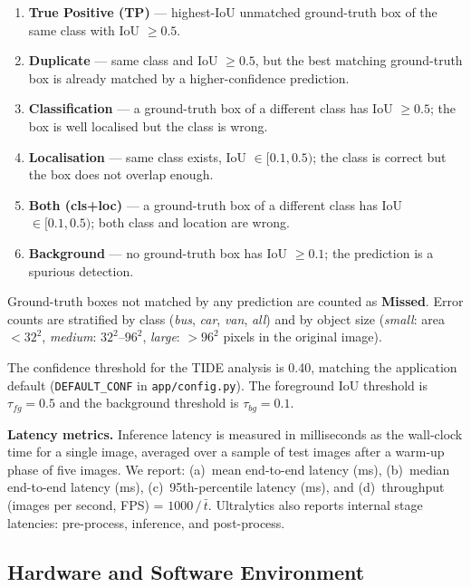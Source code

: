 \begin{enumerate}
  \item \textbf{True Positive (TP)} — highest-IoU unmatched ground-truth
        box of the same class with IoU $\ge 0.5$.
  \item \textbf{Duplicate} — same class and IoU $\ge 0.5$, but the
        best matching ground-truth box is already matched by a
        higher-confidence prediction.
  \item \textbf{Classification} — a ground-truth box of a different class
        has IoU $\ge 0.5$; the box is well localised but the class is wrong.
  \item \textbf{Localisation} — same class exists, IoU $\in [0.1, 0.5)$;
        the class is correct but the box does not overlap enough.
  \item \textbf{Both (cls+loc)} — a ground-truth box of a different class
        has IoU $\in [0.1, 0.5)$; both class and location are wrong.
  \item \textbf{Background} — no ground-truth box has IoU $\ge 0.1$;
        the prediction is a spurious detection.
\end{enumerate}

Ground-truth boxes not matched by any prediction are counted as
\textbf{Missed}.
Error counts are stratified by class (\textit{bus}, \textit{car},
\textit{van}, \textit{all}) and by object size
(\textit{small}: area~$<32^2$, \textit{medium}: $32^2$–$96^2$,
\textit{large}: $>96^2$ pixels in the original image).

The confidence threshold for the TIDE analysis is 0.40, matching the
application default (\texttt{DEFAULT\_CONF} in \texttt{app/config.py}).
The foreground IoU threshold is $\tau_{fg} = 0.5$ and the background
threshold is $\tau_{bg} = 0.1$.

\textbf{Latency metrics.}
Inference latency is measured in milliseconds as the wall-clock time for a
single image, averaged over a sample of test images after a warm-up phase of
five images.
We report:
(a)~mean end-to-end latency (ms),
(b)~median end-to-end latency (ms),
(c)~95th-percentile latency (ms), and
(d)~throughput (images per second, FPS) = $1000\,/\,\bar{t}$.
Ultralytics also reports internal stage latencies: pre-process,
inference, and post-process.

\subsection{Hardware and Software Environment}
\label{sec:env}

